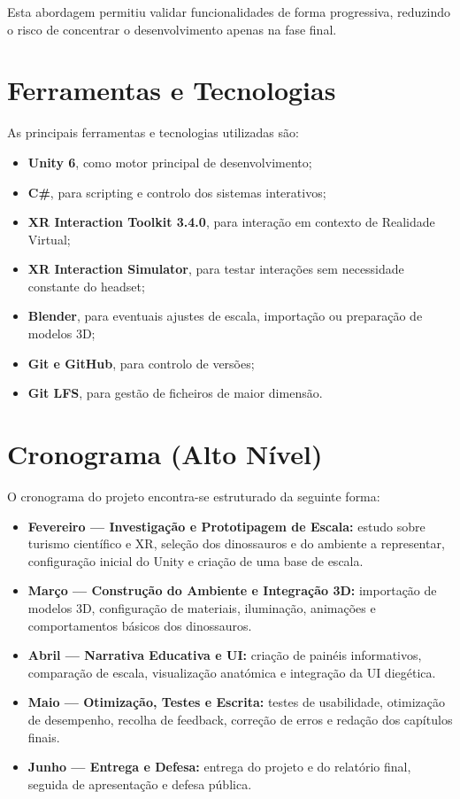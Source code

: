 \documentclass[a4paper,11pt]{report}
\begin{document}
Esta abordagem permitiu validar funcionalidades de forma progressiva, reduzindo
o risco de concentrar o desenvolvimento apenas na fase final.

\section{Ferramentas e Tecnologias}

As principais ferramentas e tecnologias utilizadas são:

\begin{itemize}
    \setlength\itemsep{0pt}
    \item \textbf{Unity 6}, como motor principal de desenvolvimento;
    \item \textbf{C\#}, para scripting e controlo dos sistemas interativos;
    \item \textbf{XR Interaction Toolkit 3.4.0}, para interação em contexto
          de Realidade Virtual;
    \item \textbf{XR Interaction Simulator}, para testar interações sem
          necessidade constante do headset;
    \item \textbf{Blender}, para eventuais ajustes de escala, importação ou
          preparação de modelos 3D;
    \item \textbf{Git e GitHub}, para controlo de versões;
    \item \textbf{Git LFS}, para gestão de ficheiros de maior dimensão.
\end{itemize}

\section{Cronograma (Alto Nível)}

O cronograma do projeto encontra-se estruturado da seguinte forma:

\begin{itemize}
    \item \textbf{Fevereiro --- Investigação e Prototipagem de Escala:}
    estudo sobre turismo científico e XR, seleção dos dinossauros e do
    ambiente a representar, configuração inicial do Unity e criação de uma
    base de escala.

    \item \textbf{Março --- Construção do Ambiente e Integração 3D:}
    importação de modelos 3D, configuração de materiais, iluminação,
    animações e comportamentos básicos dos dinossauros.

    \item \textbf{Abril --- Narrativa Educativa e UI:}
    criação de painéis informativos, comparação de escala, visualização
    anatómica e integração da UI diegética.

    \item \textbf{Maio --- Otimização, Testes e Escrita:}
    testes de usabilidade, otimização de desempenho, recolha de feedback,
    correção de erros e redação dos capítulos finais.

    \item \textbf{Junho --- Entrega e Defesa:}
    entrega do projeto e do relatório final, seguida de apresentação e
    defesa pública.
\end{itemize}
\end{document}
